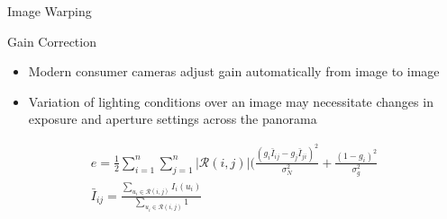 \documentclass{beamer}
\begin{document}
\begin{frame}{Image Warping}

\end{frame}

\begin{frame}{Gain Correction}
\begin{itemize}
	\item Modern consumer cameras adjust gain automatically from image to image
	\item Variation of lighting conditions over an image may necessitate changes in exposure and aperture settings across the panorama
\end{itemize}
\begin{align}
e = \frac{1}{2} \sum^n_{i=1} \sum^n_{j=1} |\mathcal{R}(i,j)| (\frac{(g_i \bar{I}_{ij} - g_j \bar{I}_{ji})^2}{\sigma_N^2} + \frac{(1-g_i)^2}{\sigma_g^2}\\
\bar{I}_{ij} = \frac{\sum_{u_i \in \mathcal{R}(i,j)} I_i(u_i)}{\sum_{u_i \in \mathcal{R}(i,j)} 1}
\end{align}

\end{frame}
\end{document}
